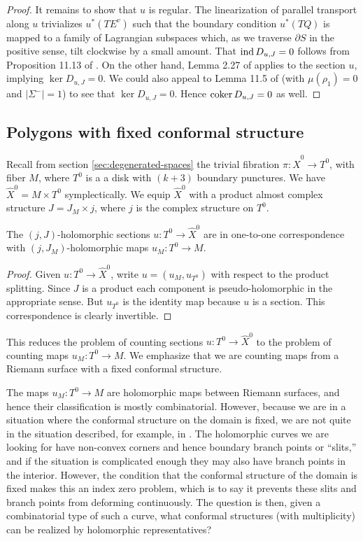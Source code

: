 \documentclass[12pt]{amsart}
\begin{document}
\begin{proof}
  It remains to show that $u$ is regular. The linearization of
  parallel transport along $u$ trivializes $u^*(TE^v)$ such that the
  boundary condition $u^*(TQ)$ is mapped to a family of Lagrangian
  subspaces which, as we traverse $\partial S$ in the positive sense,
  tilt clockwise by a small amount. That $\operatorname{ind} D_{u,J} = 0$ follows from Proposition 11.13 of \cite{seidel-book}.  On the
  other hand, Lemma 2.27 of \cite{seidel-les} applies to the section
  $u$, implying $\ker D_{u,J} = 0$. We could also appeal to Lemma 11.5 of \cite{seidel-book} (with $\mu(\rho_1) = 0$ and $|\Sigma^-| = 1$) to see that $\ker D_{u,J} = 0$. Hence $\operatorname{coker} D_{u,J} = 0$ as well.
\end{proof}

\subsection{Polygons with fixed conformal structure}
\label{sec:sections-polygon}

Recall from section \ref{sec:degenerated-spaces} the trivial fibration
$\pi: \hat{X}^0 \to T^0$, with fiber $M$, where $T^0$ is a a disk with
$(k+3)$ boundary punctures. We have $\hat{X}^0 = M \times T^0$
symplectically. We equip $\hat{X}^0$ with a product almost complex
structure $J = J_M \times j$, where $j$ is the complex structure on $T^0$.

\begin{proposition}
  \label{prop:sections-polygon}
  The $(j,J)$-holomorphic sections $u: T^0 \to \hat{X}^0$ are in
  one-to-one correspondence with $(j,J_M)$-holomorphic maps $u_M: T^0
  \to M$.
\end{proposition}

\begin{proof}
  Given $u: T^0 \to \hat{X}^0$, write $u =(u_M, u_{T^0})$ with respect
  to the product splitting. Since $J$ is a product each component is
  pseudo-holomorphic in the appropriate sense. But $u_{T^0}$ is the
  identity map because $u$ is a section. This correspondence is
  clearly invertible.
\end{proof}

This reduces the problem of counting sections $u:T^0 \to \hat{X}^0$ to
the problem of counting maps $u_M: T^0 \to M$. We emphasize that we
are counting maps from a Riemann surface with a fixed conformal
structure.

The maps $u_M:T^0 \to M$ are holomorphic maps between Riemann surfaces,
and hence their classification is mostly combinatorial. However,
because we are in a situation where the conformal structure on the
domain is fixed, we are not quite in the situation described, for
example, in \cite[\S 13]{seidel-book}. The holomorphic curves we are
looking for have non-convex corners and hence boundary branch points
or ``slits,'' and if the situation is complicated enough they may also
have branch points in the interior. However, the condition that the
conformal structure of the domain is fixed makes this an index zero
problem, which is to say it prevents these slits and branch points
from deforming continuously. The question is then, given a
combinatorial type of such a curve, what conformal structures (with
multiplicity) can be realized by holomorphic representatives?
\end{document}
